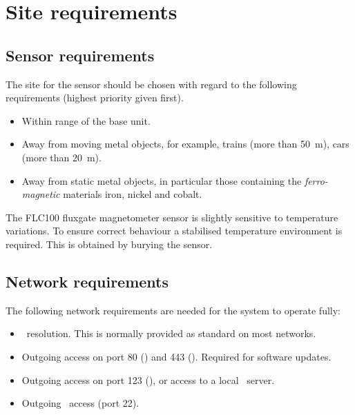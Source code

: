 \chapter{Site requirements}

\section{Sensor requirements}
The site for the sensor should be chosen with regard to the following
requirements (highest priority given first).

\begin{itemize}
\item Within range of the base unit.
\item Away from moving metal objects, for example, trains (more than
  \SI{50}{\metre}), cars (more than \SI{20}{\metre}).
\item Away from static metal objects, in particular those containing
  the \emph{ferro-magnetic} materials iron, nickel and cobalt.
\end{itemize}

The FLC100 fluxgate magnetometer sensor is slightly sensitive to
temperature variations. To ensure correct behaviour a stabilised
temperature environment is required. This is obtained by burying the
sensor.

\section{Network requirements}

The following network requirements are needed for the system to
operate fully:
\begin{itemize}
\item \dns\ resolution. This is normally provided
  as standard on most networks.
\item Outgoing access on port 80 (\http) and 443 (\https). Required
  for software updates.
\item Outgoing access on port 123 (\ntp), or access to a local \ntp\
  server.
\item Outgoing \ssh\ access (port 22).
\end{itemize}




